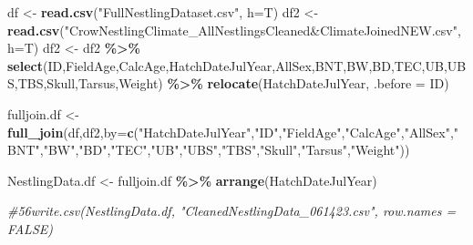\documentclass[
]{article}
\newenvironment{Shaded}{\begin{snugshade}}{\end{snugshade}}
\newcommand{\AttributeTok}[1]{\textcolor[rgb]{0.13,0.29,0.53}{#1}}
\newcommand{\CommentTok}[1]{\textcolor[rgb]{0.56,0.35,0.01}{\textit{#1}}}
\newcommand{\FunctionTok}[1]{\textcolor[rgb]{0.13,0.29,0.53}{\textbf{#1}}}
\newcommand{\NormalTok}[1]{#1}
\newcommand{\OtherTok}[1]{\textcolor[rgb]{0.56,0.35,0.01}{#1}}
\newcommand{\SpecialCharTok}[1]{\textcolor[rgb]{0.81,0.36,0.00}{\textbf{#1}}}
\newcommand{\StringTok}[1]{\textcolor[rgb]{0.31,0.60,0.02}{#1}}
\begin{document}
\begin{Shaded}
\begin{Highlighting}[]
\NormalTok{df }\OtherTok{\textless{}{-}} \FunctionTok{read.csv}\NormalTok{(}\StringTok{"FullNestlingDataset.csv"}\NormalTok{, }\AttributeTok{h=}\NormalTok{T)}
\NormalTok{df2 }\OtherTok{\textless{}{-}} \FunctionTok{read.csv}\NormalTok{(}\StringTok{"CrowNestlingClimate\_AllNestlingsCleaned\&ClimateJoinedNEW.csv"}\NormalTok{, }\AttributeTok{h=}\NormalTok{T)}
\NormalTok{df2 }\OtherTok{\textless{}{-}}\NormalTok{ df2 }\SpecialCharTok{\%\textgreater{}\%} 
  \FunctionTok{select}\NormalTok{(ID,FieldAge,CalcAge,HatchDateJulYear,AllSex,BNT,BW,BD,TEC,UB,UBS,TBS,Skull,Tarsus,Weight) }\SpecialCharTok{\%\textgreater{}\%} 
  \FunctionTok{relocate}\NormalTok{(HatchDateJulYear, }\AttributeTok{.before =}\NormalTok{ ID)}

\NormalTok{fulljoin.df }\OtherTok{\textless{}{-}} \FunctionTok{full\_join}\NormalTok{(df,df2,}\AttributeTok{by=}\FunctionTok{c}\NormalTok{(}\StringTok{"HatchDateJulYear"}\NormalTok{,}\StringTok{"ID"}\NormalTok{,}\StringTok{"FieldAge"}\NormalTok{,}\StringTok{"CalcAge"}\NormalTok{,}\StringTok{"AllSex"}\NormalTok{,}\StringTok{"BNT"}\NormalTok{,}\StringTok{"BW"}\NormalTok{,}\StringTok{"BD"}\NormalTok{,}\StringTok{"TEC"}\NormalTok{,}\StringTok{"UB"}\NormalTok{,}\StringTok{"UBS"}\NormalTok{,}\StringTok{"TBS"}\NormalTok{,}\StringTok{"Skull"}\NormalTok{,}\StringTok{"Tarsus"}\NormalTok{,}\StringTok{"Weight"}\NormalTok{))}

\NormalTok{NestlingData.df }\OtherTok{\textless{}{-}}\NormalTok{ fulljoin.df }\SpecialCharTok{\%\textgreater{}\%} 
  \FunctionTok{arrange}\NormalTok{(HatchDateJulYear)}

\CommentTok{\#56write.csv(NestlingData.df, "CleanedNestlingData\_061423.csv", row.names = FALSE)}
\end{Highlighting}
\end{Shaded}
\end{document}
